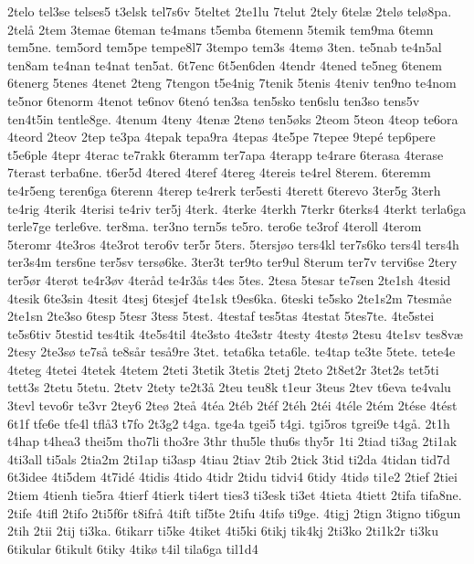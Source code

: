 2telo
tel3se
telses5
t3elsk
tel7s6v
5teltet
2te1lu
7telut
2tely
6tel^^e6
2tel^^f8
tel^^f88pa.
2tel^^e5
2tem
3temae
6teman
te4mans
t5emba
6temenn
5temik
tem9ma
6temn
tem5ne.
tem5ord
tem5pe
tempe8l7
3tempo
tem3s
4tem^^f8
3ten.
te5nab
te4n5al
ten8am
te4nan
te4nat
ten5at.
6t7enc
6t5en6den
4tendr
4tened
te5neg
6tenem
6tenerg
5tenes
4tenet
2teng
7tengon
t5e4nig
7tenik
5tenis
4teniv
ten9no
te4nom
te5nor
6tenorm
4tenot
te6nov
6ten^^f3
ten3sa
ten5sko
ten6slu
ten3so
tens5v
ten4t5in
tentle8ge.
4tenum
4teny
4ten^^e6
2ten^^f8
ten5^^f8ks
2teom
5teon
4teop
te6ora
4teord
2teov
2tep
te3pa
4tepak
tepa9ra
4tepas
4te5pe
7tepee
9tep^^e9
tep6pere
t5e6ple
4tepr
4terac
te7rakk
6teramm
ter7apa
4terapp
te4rare
6terasa
4terase
7terast
terba6ne.
t6er5d
4tered
4teref
4tereg
4tereis
te4rel
8terem.
6teremm
te4r5eng
teren6ga
6terenn
4terep
te4rerk
ter5esti
4terett
6terevo
3ter5g
3terh
te4rig
4terik
4terisi
te4riv
ter5j
4terk.
4terke
4terkh
7terkr
6terks4
4terkt
terla6ga
terle7ge
terle6ve.
ter8ma.
ter3no
tern5s
te5ro.
tero6e
te3rof
4teroll
4terom
5teromr
4te3ros
4te3rot
tero6v
ter5r
5ters.
5tersj^^f8o
ters4kl
ter7s6ko
ters4l
ters4h
ter3s4m
ters6ne
ter5sv
ters^^f86ke.
3ter3t
ter9to
ter9ul
8terum
ter7v
tervi6se
2tery
ter5^^f8r
4ter^^f8t
te4r3^^f8v
4ter^^e5d
te4r3^^e5s
t4es
5tes.
2tesa
5tesar
te7sen
2te1sh
4tesid
4tesik
6te3sin
4tesit
4tesj
6tesjef
4te1sk
t9es6ka.
6teski
te5sko
2te1s2m
7tesm^^e5e
2te1sn
2te3so
6tesp
5tesr
3tess
5test.
4testaf
tes5tas
4testat
5tes7te.
4te5stei
te5s6tiv
5testid
tes4tik
4te5s4til
4te3sto
4te3str
4testy
4test^^f8
2tesu
4te1sv
tes8v^^e6
2tesy
2te3s^^f8
te7s^^e5
te8s^^e5r
tes^^e59re
3tet.
teta6ka
teta6le.
te4tap
te3te
5tete.
tete4e
4teteg
4tetei
4tetek
4tetem
2teti
3tetik
3tetis
2tetj
2teto
2t8et2r
3tet2s
tet5ti
tett3s
2tetu
5tetu.
2tetv
2tety
te2t3^^e5
2teu
teu8k
t1eur
3teus
2tev
t6eva
te4valu
3tevl
tevo6r
te3vr
2tey6
2te^^f8
2te^^e5
4t^^e9a
2t^^e9b
2t^^e9f
2t^^e9h
2t^^e9i
4t^^e9le
2t^^e9m
2t^^e9se
4t^^e9st
6t1f
tfe6e
tfe4l
tfl^^e53
t7fo
2t3g2
t4ga.
tge4a
tgei5
t4gi.
tgi5ros
tgrei9e
t4g^^e5.
2t1h
t4hap
t4hea3
thei5m
tho7li
tho3re
3thr
thu5le
thu6s
thy5r
1ti
2tiad
ti3ag
2ti1ak
4ti3all
ti5als
2tia2m
2ti1ap
ti3asp
4tiau
2tiav
2tib
2tick
3tid
ti2da
4tidan
tid7d
6t3idee
4ti5dem
4t7id^^e9
4tidis
4tido
4tidr
2tidu
tidvi4
6tidy
4tid^^f8
ti1e2
2tief
2tiei
2tiem
4tienh
tie5ra
4tierf
4tierk
ti4ert
ties3
ti3esk
ti3et
4tieta
4tiett
2tifa
tifa8ne.
2tife
4tifl
2tifo
2ti5f6r
t8ifr^^e5
4tift
tif5te
2tifu
4tif^^f8
ti9ge.
4tigj
2tign
3tigno
ti6gun
2tih
2tii
2tij
ti3ka.
6tikarr
ti5ke
4tiket
4ti5ki
6tikj
tik4kj
2ti3ko
2ti1k2r
ti3ku
6tikular
6tikult
6tiky
4tik^^f8
t4il
tila6ga
til1d4
